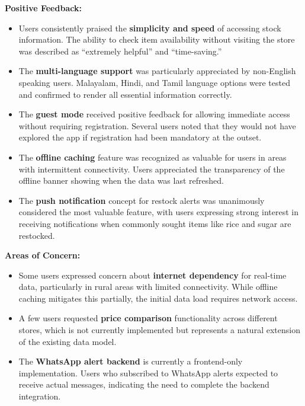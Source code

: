 \textbf{Positive Feedback:}
\begin{itemize}
    \item Users consistently praised the \textbf{simplicity and speed} of accessing stock information. The ability to check item availability without visiting the store was described as ``extremely helpful'' and ``time-saving.''

    \item The \textbf{multi-language support} was particularly appreciated by non-English speaking users. Malayalam, Hindi, and Tamil language options were tested and confirmed to render all essential information correctly.

    \item The \textbf{guest mode} received positive feedback for allowing immediate access without requiring registration. Several users noted that they would not have explored the app if registration had been mandatory at the outset.

    \item The \textbf{offline caching} feature was recognized as valuable for users in areas with intermittent connectivity. Users appreciated the transparency of the offline banner showing when the data was last refreshed.

    \item The \textbf{push notification} concept for restock alerts was unanimously considered the most valuable feature, with users expressing strong interest in receiving notifications when commonly sought items like rice and sugar are restocked.
\end{itemize}

\textbf{Areas of Concern:}
\begin{itemize}
    \item Some users expressed concern about \textbf{internet dependency} for real-time data, particularly in rural areas with limited connectivity. While offline caching mitigates this partially, the initial data load requires network access.

    \item A few users requested \textbf{price comparison} functionality across different stores, which is not currently implemented but represents a natural extension of the existing data model.

    \item The \textbf{WhatsApp alert backend} is currently a frontend-only implementation. Users who subscribed to WhatsApp alerts expected to receive actual messages, indicating the need to complete the backend integration.
\end{itemize}

